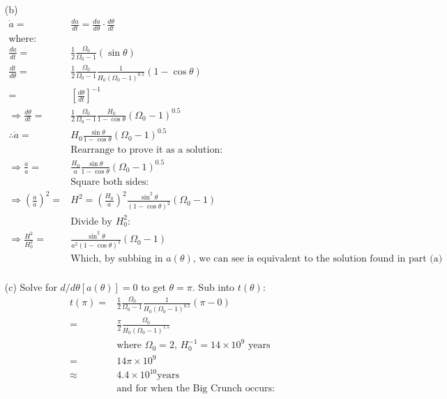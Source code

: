 \documentclass[10pt,a4paper]{article}
\begin{document}
\begin{itemize}
	\item[(b)] 
	\begin{align*}
		\dot a =& \frac{da}{dt} = \frac{da}{d\theta}\cdot \frac{d\theta}{dt} & \\
		\mbox{where:} &&\\
		\frac{da}{dt} =& \frac{1}{2}\frac{\Omega_{0}}{\Omega_{0} - 1} (\sin \theta) &\\
		\frac{dt}{d\theta} =& \frac{1}{2}\frac{\Omega_{0}}{\Omega_{0}-1}\frac{1}{H_{0}(\Omega_{0} - 1)^{0.5}} (1-\cos \theta) & \\
		=& [\frac{d\theta}{dt}]^{-1} \\
		\Rightarrow \frac{d\theta}{dt} =& \frac{1}{2}\frac{\Omega_{0}}{\Omega_{0}-1}\frac{H_{0}}{1-\cos \theta}(\Omega_{0} - 1)^{0.5} &\\
		\therefore \dot a =& H_{0}\frac{\sin \theta}{1-\cos \theta}(\Omega_{0} - 1)^{0.5} \\
		&\mbox{Rearrange to prove it as a solution:}& \\
		\Rightarrow \frac{\dot a}{a} =& \frac{H_{0}}{a}\frac{\sin \theta}{1-\cos \theta}(\Omega_{0} - 1)^{0.5} \\
		&\mbox{Square both sides:}& \\
		\Rightarrow (\frac{\dot a}{a})^{2} =& H^{2} = (\frac{H_{0}}{a})^{2}\frac{\sin^{2} \theta}{(1-\cos \theta)^{2}} (\Omega_{0} - 1) &\\
		&\mbox{Divide by $H_{0}^{2}$:}& \\
		\Rightarrow \frac{H^{2}}{H_{0}^{2}} =& \frac{\sin^{2} \theta}{a^{2}(1-\cos \theta)^{2}} (\Omega_{0} - 1) &\\
		&\mbox{Which, by subbing in $a(\theta)$, we can see is equivalent to the solution found in part (a)}& \\
	\end{align*}
	\item[(c)] Solve for $d/d\theta [a(\theta)] = 0$ to get $\theta = \pi$. Sub into $t(\theta)$:
	\begin{align*}
	t(\pi) =& \frac{1}{2}\frac{\Omega_{0}}{\Omega_{0} - 1} \frac{1}{H_{0}(\Omega_{0} - 1)^{0.5}} (\pi - 0) \\
	       =& \frac{\pi}{2}\frac{\Omega_{0}}{H_{0}(\Omega_{0} - 1)^{1.5}} \\
		   &\mbox{where $\Omega_{0} = 2$, $H_{0}^{-1} = 14 \times 10^{9}$ years} \\
		   =& 14\pi \times 10^{9} \\
		   \approx& 4.4 \times 10^{10} \mbox{years} \\
		   &\mbox{and for when the Big Crunch occurs:} \\

\end{align*}
\end{itemize}
\end{document}
